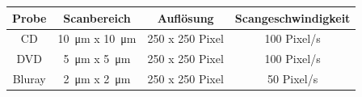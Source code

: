     \begin{center}
      \label{tab:Scanparameter}
      \begin{tabular}{c c c c}
          \toprule
          Probe & Scanbereich & Auflösung & Scangeschwindigkeit \\
          \midrule
          CD      & \SI{10}{\micro\metre} x \SI{10}{\micro\metre} & 250 x 250 Pixel & 100 Pixel/s \\
          DVD     & \SI{5}{\micro\metre} x \SI{5}{\micro\metre}   & 250 x 250 Pixel & 100 Pixel/s \\
          Bluray  & \SI{2}{\micro\metre} x \SI{2}{\micro\metre}   & 250 x 250 Pixel & 50 Pixel/s \\

          \bottomrule
      \end{tabular}
  \end{center}
